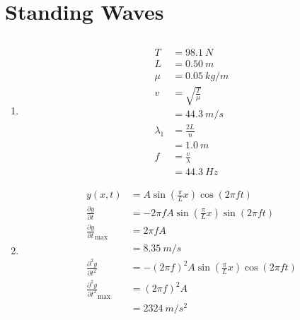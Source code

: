 \documentclass{article}
\begin{document}
\section{Standing Waves}

\subsection{}

\begin{enumerate}
  \item

        \begin{align*}
          T         & = \qty{98.1}{N}        \\
          L         & = \qty{0.50}{m}        \\
          \mu       & = \qty{0.05}{kg/m}     \\
          v         & = \sqrt{\frac{T}{\mu}} \\
                    & = \qty{44.3}{m/s}      \\
          \lambda_1 & = \frac{2 L}{n}        \\
                    & = \qty{1.0}{m}         \\
          f         & = \frac{v}{\lambda}    \\
                    & = \qty{44.3}{Hz}
        \end{align*}

  \item

        \begin{align*}
          y(x, t)                                      & = A \sin \left( \frac{\pi}{L} x \right) \cos (2 \pi f t)              \\
          \frac{\partial y}{\partial t}                & = -2 \pi f A \sin \left( \frac{\pi}{L} x \right) \sin (2 \pi f t)     \\
          \frac{\partial y}{\partial t}_\text{max}     & = 2 \pi f A                                                           \\
                                                       & = \qty{8.35}{m/s}                                                     \\
          \frac{\partial^2 y}{\partial t^2}            & = -(2 \pi f)^2 A \sin \left( \frac{\pi}{L} x \right) \cos (2 \pi f t) \\
          \frac{\partial^2 y}{\partial t^2}_\text{max} & = (2 \pi f)^2 A                                                       \\
                                                       & = \qty{2324}{m/s^2}
        \end{align*}
\end{enumerate}
\end{document}

